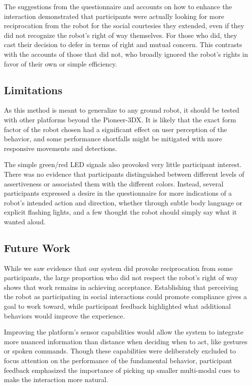 \documentclass[letterpaper, 10 pt, conference]{ieeeconf}  %
\begin{document}
The suggestions from the questionnaire and accounts on how to enhance the interaction demonstrated that participants were actually looking for more reciprocation from the robot for the social courtesies they extended, even if they did not recognize the robot's right of way themselves. For those who did, they cast their decision to defer in terms of right and mutual concern. This contrasts with the accounts of those that did not, who broadly ignored the robot's rights in favor of their own or simple efficiency.

\subsection{Limitations}

As this method is meant to generalize to any ground robot, it should be tested with other platforms beyond the Pioneer-3DX. It is likely that the exact form factor of the robot chosen had a significant effect on user perception of the behavior, and some performance shortfalls might be mitigated with more responsive movements and detections. 

The simple green/red LED signals also provoked very little participant interest. There was no evidence that participants distinguished between different levels of assertiveness or associated them with the different colors. Instead, several participants expressed a desire in the questionnaire for more indications of a robot’s intended action and direction, whether through subtle body language or explicit flashing lights, and a few thought the robot should simply say what it wanted aloud. 

\subsection{Future Work}

While we saw evidence that our system did provoke reciprocation from some participants, the large proportion who did not respect the robot's right of way shows that work remains in achieving acceptance. Establishing that perceiving the robot as participating in social interactions could promote compliance gives a goal to work toward, while participant feedback highlighted what additional behaviors would improve the experience.

Improving the platform’s sensor capabilities would allow the system to integrate more nuanced information than distance when deciding when to act, like gestures or spoken commands. Though these capabilities were deliberately excluded to focus attention on the performance of the fundamental behavior, participant feedback emphasized the importance of picking up smaller multi-modal cues to make the interaction more natural.
\end{document}
